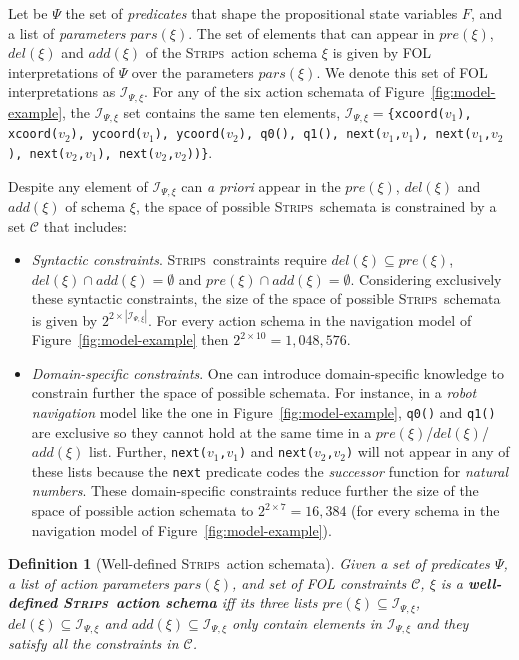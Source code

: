 \documentclass[letterpaper]{article} %
\newcommand{\strips}{\textsc{Strips}}     %
\newtheorem{definition}[theorem]{Definition}
\begin{document}
Let be $\Psi$ the set of {\em predicates} that shape the propositional state variables $F$, and a list of {\em parameters} $pars(\xi)$. The set of elements that can appear in $pre(\xi)$, $del(\xi)$ and $add(\xi)$ of the \strips\ action schema $\xi$ is given by FOL interpretations of $\Psi$ over the parameters $pars(\xi)$. We denote this set of FOL interpretations as ${\mathcal I}_{\Psi,\xi}$. For any of the six action schemata of Figure~\ref{fig:model-example}, the ${\mathcal I}_{\Psi,\xi}$ set contains the same ten elements, ${\mathcal I}_{\Psi,\xi}=${\small\tt\{xcoord($v_1$), xcoord($v_2$), ycoord($v_1$), ycoord($v_2$), q0(), q1(), next($v_1$,$v_1$), next($v_1$,$v_2$), next($v_2$,$v_1$), next($v_2$,$v_2$))\}}.

Despite any element of ${\mathcal I}_{\Psi,\xi}$ can {\em a priori} appear in the $pre(\xi)$, $del(\xi)$ and $add(\xi)$ of schema $\xi$, the space of possible \strips\ schemata is constrained by a set ${\mathcal C}$ that includes:

\begin{itemize}
\item {\em Syntactic constraints}. \strips\ constraints require $del(\xi)\subseteq pre(\xi)$, $del(\xi)\cap add(\xi)=\emptyset$ and $pre(\xi)\cap add(\xi)=\emptyset$. Considering exclusively these syntactic constraints, the size of the space of possible \strips\ schemata is given by $2^{2\times|{\mathcal I}_{\Psi,\xi}|}$. For every action schema in the navigation model of Figure~\ref{fig:model-example} then $2^{2\times 10}=1,048,576$.

\item {\em Domain-specific constraints}. One can introduce domain-specific knowledge to constrain further the space of possible schemata. For instance, in a {\em robot navigation} model like the one in Figure~\ref{fig:model-example}, {\small\tt q0()} and {\small\tt q1()} are exclusive so they cannot hold at the same time in a $pre(\xi)$/$del(\xi)$/$add(\xi)$ list. Further, {\small\tt next($v_1$,$v_1$)} and {\small\tt next($v_2$,$v_2$)} will not appear in any of these lists because the {\tt\small next} predicate codes the {\em successor} function for {\em natural numbers}. These domain-specific constraints reduce further the size of the space of possible action schemata to $2^{2\times 7}=16,384$ (for every schema in the navigation model of Figure~\ref{fig:model-example}).
\end{itemize}

\begin{definition}[Well-defined \strips\ action schemata]
Given a set of {\em predicates} $\Psi$, a list of action {\em parameters} $pars(\xi)$, and set of FOL constraints ${\mathcal C}$, $\xi$ is a {\bf well-defined \strips\ action schema} iff its three lists $pre(\xi)\subseteq {\mathcal I}_{\Psi,\xi}$, $del(\xi)\subseteq{\mathcal I}_{\Psi,\xi}$ and $add(\xi)\subseteq{\mathcal I}_{\Psi,\xi}$ only contain elements in ${\mathcal I}_{\Psi,\xi}$ and they satisfy all the constraints in ${\mathcal C}$.
\end{definition}
\end{document}
